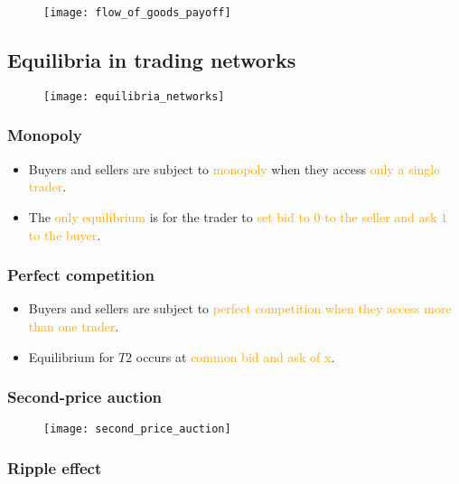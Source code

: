 \begin{figure}[H]
    \centering
    \texttt{[image: flow\_of\_goods\_payoff]}
\end{figure}

\subsection{Equilibria in trading networks}

\begin{figure}[H]
    \centering
    \texttt{[image: equilibria\_networks]}
\end{figure}

\subsubsection{Monopoly}

\begin{itemize}
\item Buyers and sellers are subject to \textcolor{orange}{monopoly} when they access \textcolor{orange}{only a single trader}.
\item The \textcolor{orange}{only equilibrium} is for the trader to \textcolor{orange}{set bid to $0$ to the seller and ask $1$ to the buyer}.
\end{itemize}

\subsubsection{Perfect competition}

\begin{itemize}
\item Buyers and sellers are subject to \textcolor{orange}{perfect competition when they access more than one trader}.
\item Equilibrium for $T2$ occurs at \textcolor{orange}{common bid and ask of x}.
\end{itemize}

\subsubsection{Second-price auction}

\begin{figure}[H]
    \centering
    \texttt{[image: second\_price\_auction]}
\end{figure}

\subsubsection{Ripple effect}


